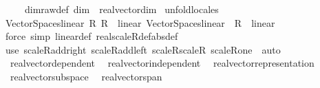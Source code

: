 \begin{isabellebody}
\ \ \ \ \ dim{\isacharunderscore}{\kern0pt}raw{\isacharunderscore}{\kern0pt}def{\isacharcolon}{\kern0pt}\ dim\ {\isacharequal}{\kern0pt}\ real{\isacharunderscore}{\kern0pt}vector{\isachardot}{\kern0pt}dim\isanewline
%
\isadelimproof
%
\endisadelimproof
%
\isatagproof
{}\isamarkupfalse%
\ unfold{\isacharunderscore}{\kern0pt}locales\isanewline
\ \ \isamarkupfalse%
\ {\isachardoublequoteopen}Vector{\isacharunderscore}{\kern0pt}Spaces{\isachardot}{\kern0pt}linear\ {\isacharparenleft}{\kern0pt}{\isacharasterisk}{\kern0pt}\isactrlsub R{\isacharparenright}{\kern0pt}\ {\isacharparenleft}{\kern0pt}{\isacharasterisk}{\kern0pt}\isactrlsub R{\isacharparenright}{\kern0pt}\ {\isacharequal}{\kern0pt}\ linear{\isachardoublequoteclose}\ {\isachardoublequoteopen}Vector{\isacharunderscore}{\kern0pt}Spaces{\isachardot}{\kern0pt}linear\ {\isacharparenleft}{\kern0pt}{\isacharasterisk}{\kern0pt}{\isacharparenright}{\kern0pt}\ {\isacharparenleft}{\kern0pt}{\isacharasterisk}{\kern0pt}\isactrlsub R{\isacharparenright}{\kern0pt}\ {\isacharequal}{\kern0pt}\ linear{\isachardoublequoteclose}\isanewline
\ \ \ \ \isamarkupfalse%
\ {\isacharparenleft}{\kern0pt}force\ simp{\isacharcolon}{\kern0pt}\ linear{\isacharunderscore}{\kern0pt}def\ real{\isacharunderscore}{\kern0pt}scaleR{\isacharunderscore}{\kern0pt}def{\isacharbrackleft}{\kern0pt}abs{\isacharunderscore}{\kern0pt}def{\isacharbrackright}{\kern0pt}{\isacharparenright}{\kern0pt}{\isacharplus}{\kern0pt}\isanewline
{}\isamarkupfalse%
\ {\isacharparenleft}{\kern0pt}use\ scaleR{\isacharunderscore}{\kern0pt}add{\isacharunderscore}{\kern0pt}right\ scaleR{\isacharunderscore}{\kern0pt}add{\isacharunderscore}{\kern0pt}left\ scaleR{\isacharunderscore}{\kern0pt}scaleR\ scaleR{\isacharunderscore}{\kern0pt}one\ \ auto{\isacharparenright}{\kern0pt}%
\endisatagproof
{\isafoldproof}%
%
\isadelimproof
\isanewline
%
\endisadelimproof
\isanewline
{}\isamarkupfalse%
\ {\isacharparenleft}{\kern0pt}%
\isanewline
\ \ real{\isacharunderscore}{\kern0pt}vector{\isachardot}{\kern0pt}dependent\isanewline
\ \ real{\isacharunderscore}{\kern0pt}vector{\isachardot}{\kern0pt}independent\isanewline
\ \ real{\isacharunderscore}{\kern0pt}vector{\isachardot}{\kern0pt}representation\isanewline
\ \ real{\isacharunderscore}{\kern0pt}vector{\isachardot}{\kern0pt}subspace\isanewline
\ \ real{\isacharunderscore}{\kern0pt}vector{\isachardot}{\kern0pt}span\isanewline

\end{isabellebody}

